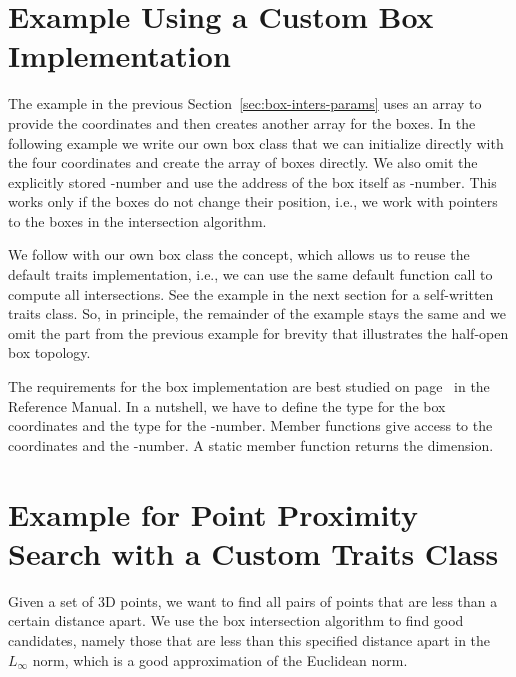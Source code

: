 \section{Example Using a Custom Box Implementation}

The example in the previous Section~\ref{sec:box-inters-params} uses
an array to provide the coordinates and then creates another array for
the boxes. In the following example we write our own box class
 that we can initialize directly with the four coordinates and
create the array of boxes directly. We also omit the explicitly stored
-number and use the address of the box itself as
-number. This works only if the boxes do not change their
position, i.e., we work with pointers to the boxes in the intersection
algorithm.

We follow with our own box class  the
 concept, which allows us to reuse the
default traits implementation, i.e., we can use the same default
function call to compute all intersections. See the example in the
next section for a self-written traits class. So, in principle, the
remainder of the example stays the same and we omit the part from the
previous example for brevity that illustrates the half-open box topology.

The requirements for the box implementation are best studied on
page~\pageref{ccRef_BoxIntersectionBox_d} in the Reference Manual. In a
nutshell, we have to define the type  for the box coordinates
and the type  for the -number. Member functions
give access to the coordinates and the -number. A static
member function returns the dimension.



\section{Example for Point Proximity Search with a Custom Traits Class}
\label{sec:box_inters_example_proximity}

Given a set of 3D points, we want to find all pairs of points that are
less than a certain distance apart. We use the box intersection
algorithm to find good candidates, namely those that are less than
this specified distance apart in the $L_\infty$ norm, which is a good
approximation of the Euclidean norm.

